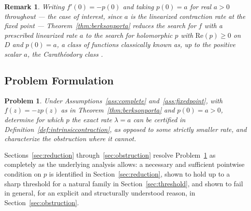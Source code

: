 \documentclass[pdflatex,sn-mathphys-num]{sn-jnl}%
\theoremstyle{thmstyleone}%
\theoremstyle{thmstyletwo}%
\newtheorem{remark}{Remark}%
\theoremstyle{thmstylethree}%
\newtheorem{problem}{Problem}
\begin{document}
\begin{remark}
\label{rem:normalization}
Writing $f'(0)=-p(0)$ and taking $p(0)=a$ for real $a>0$ throughout --- the case of interest, since $a$ is the linearized contraction rate at the fixed point --- Theorem~\ref{thm:berksonporta} reduces the search for $f$ with a prescribed linearized rate $a$ to the search for holomorphic $p$ with $\mathrm{Re}(p)\ge0$ on $D$ and $p(0)=a$, a class of functions classically known as, up to the positive scalar $a$, the Carath\'eodory class \cite{ahlfors1979complex}.
\end{remark}

\subsection{Problem Formulation}

\begin{problem}
\label{prob:main}
Under Assumptions~\ref{ass:complete} and~\ref{ass:fixedpoint}, with $f(z)=-zp(z)$ as in Theorem~\ref{thm:berksonporta} and $p(0)=a>0$, determine for which $p$ the exact rate $\lambda=a$ can be certified in Definition~\ref{def:intrinsiccontraction}, as opposed to some strictly smaller rate, and characterize the obstruction where it cannot.
\end{problem}

Sections~\ref{sec:reduction} through~\ref{sec:obstruction} resolve Problem~\ref{prob:main} as completely as the underlying analysis allows: a necessary and sufficient pointwise condition on $p$ is identified in Section~\ref{sec:reduction}, shown to hold up to a sharp threshold for a natural family in Section~\ref{sec:threshold}, and shown to fail in general, for an explicit and structurally understood reason, in Section~\ref{sec:obstruction}.

%
%
%
%
%
%
\end{document}
